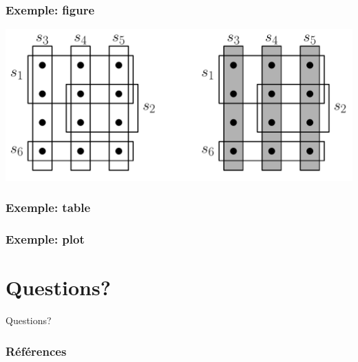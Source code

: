 \documentclass[aspectratio=169,11pt]{beamer}
\begin{document}
	\begin{frame}
		\frametitle{Exemple: figure}
		\centering
		\includegraphics[width=0.75\linewidth]{scp_example}%
	\end{frame}
	\begin{frame}
		\frametitle{Exemple: table}
		{
			\centering
			\footnotesize
			
		}
	\end{frame}
	\begin{frame}
		\frametitle{Exemple: plot}
		\centering
	\end{frame}
	\section*{Questions?}
		\begin{frame}[focus]
			Questions?
		\end{frame}
	\appendix
		\begin{frame}[t,allowframebreaks]
			\frametitle{Références}
			\printbibliography[heading=bibintoc]{}
		\end{frame}
\end{document}
